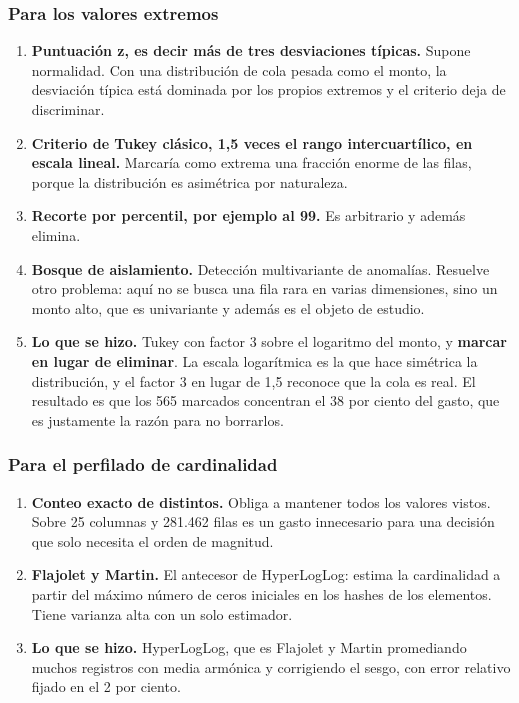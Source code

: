 \documentclass[11pt]{article}
\begin{document}
\subsubsection*{Para los valores extremos}
\begin{enumerate}
  \item \textbf{Puntuación z, es decir más de tres desviaciones típicas.} Supone normalidad. Con una distribución de cola pesada como el monto, la desviación típica está dominada por los propios extremos y el criterio deja de discriminar.
  \item \textbf{Criterio de Tukey clásico, 1,5 veces el rango intercuartílico, en escala lineal.} Marcaría como extrema una fracción enorme de las filas, porque la distribución es asimétrica por naturaleza.
  \item \textbf{Recorte por percentil, por ejemplo al 99.} Es arbitrario y además elimina.
  \item \textbf{Bosque de aislamiento.} Detección multivariante de anomalías. Resuelve otro problema: aquí no se busca una fila rara en varias dimensiones, sino un monto alto, que es univariante y además es el objeto de estudio.
  \item \textbf{Lo que se hizo.} Tukey con factor 3 sobre el logaritmo del monto, y \textbf{marcar en lugar de eliminar}. La escala logarítmica es la que hace simétrica la distribución, y el factor 3 en lugar de 1,5 reconoce que la cola es real. El resultado es que los 565 marcados concentran el 38 por ciento del gasto, que es justamente la razón para no borrarlos.
\end{enumerate}
\subsubsection*{Para el perfilado de cardinalidad}
\begin{enumerate}
  \item \textbf{Conteo exacto de distintos.} Obliga a mantener todos los valores vistos. Sobre 25 columnas y 281.462 filas es un gasto innecesario para una decisión que solo necesita el orden de magnitud.
  \item \textbf{Flajolet y Martin.} El antecesor de HyperLogLog: estima la cardinalidad a partir del máximo número de ceros iniciales en los hashes de los elementos. Tiene varianza alta con un solo estimador.
  \item \textbf{Lo que se hizo.} HyperLogLog, que es Flajolet y Martin promediando muchos registros con media armónica y corrigiendo el sesgo, con error relativo fijado en el 2 por ciento.
\end{enumerate}
\end{document}
